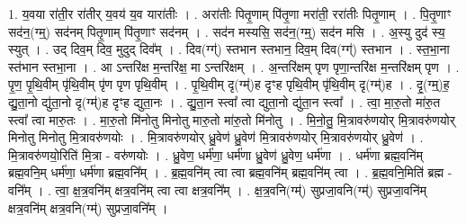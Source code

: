 \documentclass[17pt]{extarticle}
\begin{document}
1. य॒वया रा॑ती॒र रा॑तीर् य॒वय॑ य॒व यारा॑तीः । . अरा॑तीः पितृ॒णाम् पि॑तृ॒णा मरा॑ती॒ ररा॑तीः पितृ॒णाम् । . पि॒तृ॒णाꣳ सद॑न॒(ग्म्॒) सद॑नम् पितृ॒णाम् पि॑तृ॒णाꣳ सद॑नम् । . सद॑न मस्यसि॒ सद॑न॒(ग्म्॒) सद॑न मसि । . अ॒स्यु दुद॑ स्य॒ स्युत् । . उद् दिव॒म् दिव॒ मुदुद् दिव᳚म् । . दिव(ग्ग्॑) स्तभान स्तभान॒ दिव॒म् दिव(ग्ग्॑) स्तभान । . स्त॒भा॒ना स्त॑भान स्तभा॒ना । . आ ऽन्तरि॑क्ष म॒न्तरि॑क्ष॒ मा ऽन्तरि॑क्षम् । . अ॒न्तरि॑क्षम् पृण पृणा॒न्तरि॑क्ष म॒न्तरि॑क्षम् पृण । . पृ॒ण॒ पृ॒थि॒वीम् पृ॑थि॒वीम् पृ॑ण पृण पृथि॒वीम् । . पृ॒थि॒वीम् दृ(ग्म्॑)ह दृꣳह पृथि॒वीम् पृ॑थि॒वीम् दृ(ग्म्॑)ह । . दृ॒(ग्म्॒)ह॒ द्यु॒ता॒नो द्यु॑ता॒नो दृ(ग्म्॑)ह दृꣳह द्युता॒नः । . द्यु॒ता॒न स्त्वा᳚ त्वा द्युता॒नो द्यु॑ता॒न स्त्वा᳚ । . त्वा॒ मा॒रु॒तो मा॑रु॒त स्त्वा᳚ त्वा मारु॒तः । . मा॒रु॒तो मि॑नोतु मिनोतु मारु॒तो मा॑रु॒तो मि॑नोतु । . मि॒नो॒तु॒ मि॒त्रावरु॑णयोर् मि॒त्रावरु॑णयोर् मिनोतु मिनोतु मि॒त्रावरु॑णयोः । . मि॒त्रावरु॑णयोर् ध्रु॒वेण॑ ध्रु॒वेण॑ मि॒त्रावरु॑णयोर् मि॒त्रावरु॑णयोर् ध्रु॒वेण॑ । . मि॒त्रावरु॑णयो॒रिति॑ मि॒त्रा - वरु॑णयोः । . ध्रु॒वेण॒ धर्म॑णा॒ धर्म॑णा ध्रु॒वेण॑ ध्रु॒वेण॒ धर्म॑णा । . धर्म॑णा ब्रह्म॒वनि॑म् ब्रह्म॒वनि॒म् धर्म॑णा॒ धर्म॑णा ब्रह्म॒वनि᳚म् । . ब्र॒ह्म॒वनि॑म् त्वा त्वा ब्रह्म॒वनि॑म् ब्रह्म॒वनि॑म् त्वा । . ब्र॒ह्म॒वनि॒मिति॑ ब्रह्म - वनि᳚म् । . त्वा॒ क्ष॒त्र॒वनि॑म् क्षत्र॒वनि॑म् त्वा त्वा क्षत्र॒वनि᳚म् । . क्ष॒त्र॒वनि(ग्म्॑) सुप्रजा॒वनि(ग्म्॑) सुप्रजा॒वनि॑म् क्षत्र॒वनि॑म् क्षत्र॒वनि(ग्म्॑) सुप्रजा॒वनि᳚म् । \newline
\end{document}
